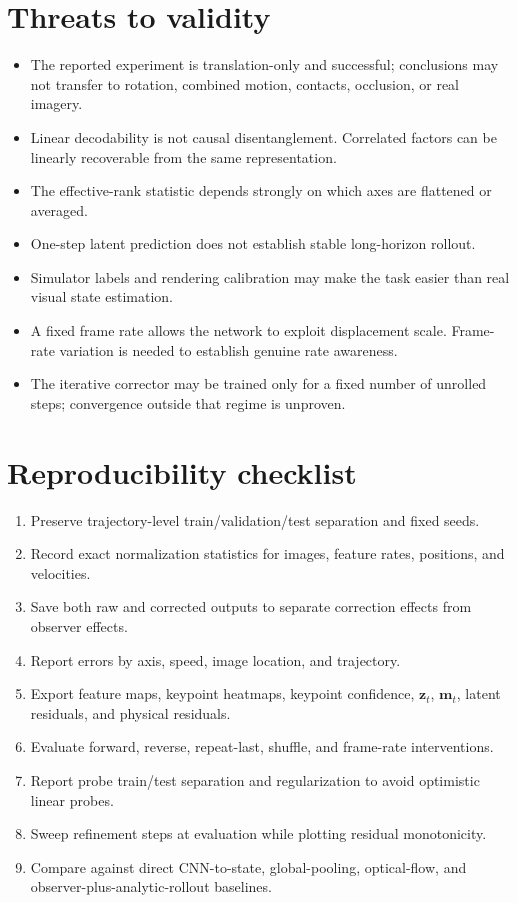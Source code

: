 \documentclass[11pt,a4paper]{article}
\begin{document}
\section{Threats to validity}
\begin{itemize}
\item The reported experiment is translation-only and successful; conclusions may not transfer to rotation, combined motion, contacts, occlusion, or real imagery.
\item Linear decodability is not causal disentanglement. Correlated factors can be linearly recoverable from the same representation.
\item The effective-rank statistic depends strongly on which axes are flattened or averaged.
\item One-step latent prediction does not establish stable long-horizon rollout.
\item Simulator labels and rendering calibration may make the task easier than real visual state estimation.
\item A fixed frame rate allows the network to exploit displacement scale. Frame-rate variation is needed to establish genuine rate awareness.
\item The iterative corrector may be trained only for a fixed number of unrolled steps; convergence outside that regime is unproven.
\end{itemize}

\section{Reproducibility checklist}
\begin{enumerate}
\item Preserve trajectory-level train/validation/test separation and fixed seeds.
\item Record exact normalization statistics for images, feature rates, positions, and velocities.
\item Save both raw and corrected outputs to separate correction effects from observer effects.
\item Report errors by axis, speed, image location, and trajectory.
\item Export feature maps, keypoint heatmaps, keypoint confidence, $\bm z_t$, $\bm m_t$, latent residuals, and physical residuals.
\item Evaluate forward, reverse, repeat-last, shuffle, and frame-rate interventions.
\item Report probe train/test separation and regularization to avoid optimistic linear probes.
\item Sweep refinement steps at evaluation while plotting residual monotonicity.
\item Compare against direct CNN-to-state, global-pooling, optical-flow, and observer-plus-analytic-rollout baselines.
\end{enumerate}
\end{document}

